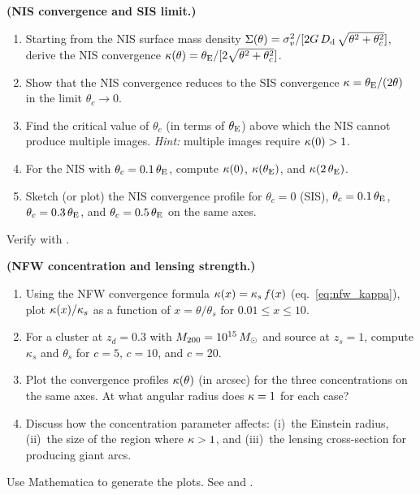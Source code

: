 \begin{exercise}
\label{ex:nis_convergence}
\textbf{(NIS convergence and SIS limit.)}
\begin{enumerate}[label=(\alph*)]
    \item Starting from the NIS surface mass density
          $\Sigma(\theta) = \sigma_v^2 / [2G\,D_{\mathrm{d}}\,
          \sqrt{\theta^2 + \theta_c^2}]$, derive the NIS convergence
          $\kappa(\theta) = \theta_{\mathrm{E}} / [2\sqrt{\theta^2 + \theta_c^2}]$.
    \item Show that the NIS convergence reduces to the SIS convergence
          $\kappa = \theta_{\mathrm{E}}/(2\theta)$ in the limit $\theta_c \to 0$.
    \item Find the critical value of $\theta_c$ (in terms of $\theta_{\mathrm{E}}$)
          above which the NIS cannot produce multiple images.
          \textit{Hint:} multiple images require $\kappa(0) > 1$.
    \item For the NIS with $\theta_c = 0.1\,\theta_{\mathrm{E}}$, compute
          $\kappa(0)$, $\kappa(\theta_{\mathrm{E}})$, and
          $\kappa(2\,\theta_{\mathrm{E}})$.
    \item Sketch (or plot) the NIS convergence profile for
          $\theta_c = 0$ (SIS), $\theta_c = 0.1\,\theta_{\mathrm{E}}$,
          $\theta_c = 0.3\,\theta_{\mathrm{E}}$, and $\theta_c = 0.5\,\theta_{\mathrm{E}}$
          on the same axes.
\end{enumerate}
Verify with
.
\end{exercise}

\begin{exercise}
\label{ex:nfw_concentration}
\textbf{(NFW concentration and lensing strength.)}
\begin{enumerate}[label=(\alph*)]
    \item Using the NFW convergence formula
          $\kappa(x) = \kappa_s\,f(x)$ (eq.~\ref{eq:nfw_kappa}),
          plot $\kappa(x)/\kappa_s$ as a function of
          $x = \theta/\theta_s$ for $0.01 \leq x \leq 10$.
    \item For a cluster at $z_d = 0.3$ with $M_{200} = 10^{15}\,M_{\odot}$
          and source at $z_s = 1$, compute $\kappa_s$ and $\theta_s$
          for $c = 5$, $c = 10$, and $c = 20$.
    \item Plot the convergence profiles $\kappa(\theta)$ (in arcsec)
          for the three concentrations on the same axes.  At what
          angular radius does $\kappa = 1$ for each case?
    \item Discuss how the concentration parameter affects:
          (i)~the Einstein radius, (ii)~the size of the region
          where $\kappa > 1$, and (iii)~the lensing cross-section
          for producing giant arcs.
\end{enumerate}
Use Mathematica to generate the plots.
See 
and .
\end{exercise}
